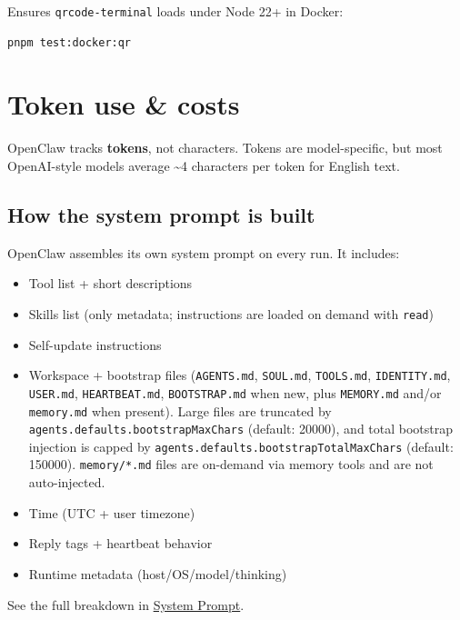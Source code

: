 Ensures \texttt{qrcode-terminal} loads under Node 22+ in Docker:

\begin{lstlisting}[language=bash]
pnpm test:docker:qr
\end{lstlisting}



\clearpage

\section{Token use \& costs}


OpenClaw tracks \textbf{tokens}, not characters. Tokens are model-specific, but most
OpenAI-style models average \textasciitilde{}4 characters per token for English text.

\subsection{How the system prompt is built}


OpenClaw assembles its own system prompt on every run. It includes:

\begin{itemize}
  \item Tool list + short descriptions
  \item Skills list (only metadata; instructions are loaded on demand with \texttt{read})
  \item Self-update instructions
  \item Workspace + bootstrap files (\texttt{AGENTS.md}, \texttt{SOUL.md}, \texttt{TOOLS.md}, \texttt{IDENTITY.md}, \texttt{USER.md}, \texttt{HEARTBEAT.md}, \texttt{BOOTSTRAP.md} when new, plus \texttt{MEMORY.md} and/or \texttt{memory.md} when present). Large files are truncated by \texttt{agents.defaults.bootstrapMaxChars} (default: 20000), and total bootstrap injection is capped by \texttt{agents.defaults.bootstrapTotalMaxChars} (default: 150000). \texttt{memory/*.md} files are on-demand via memory tools and are not auto-injected.
  \item Time (UTC + user timezone)
  \item Reply tags + heartbeat behavior
  \item Runtime metadata (host/OS/model/thinking)
\end{itemize}


See the full breakdown in \href{/concepts/system-prompt}{System Prompt}.

